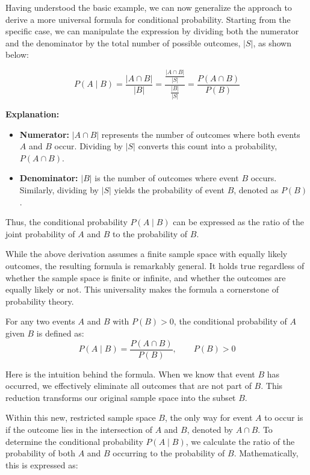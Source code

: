 Having understood the basic example, we can now generalize the approach to derive a more universal formula for conditional probability. Starting from the specific case, we can manipulate the expression by dividing both the numerator and the denominator by the total number of possible outcomes, \( |S| \), as shown below:

\[
P(A \mid B) = \frac{|A \cap B|}{|B|} = \frac{\frac{|A \cap B|}{|S|}}{\frac{|B|}{|S|}} = \frac{P(A \cap B)}{P(B)}
\]

\textbf{Explanation:}

\begin{itemize}
    \item \textbf{Numerator:} \( |A \cap B| \) represents the number of outcomes where both events \( A \) and \( B \) occur. Dividing by \( |S| \) converts this count into a probability, \( P(A \cap B) \).
    \item \textbf{Denominator:} \( |B| \) is the number of outcomes where event \( B \) occurs. Similarly, dividing by \( |S| \) yields the probability of event \( B \), denoted as \( P(B) \).
\end{itemize}

Thus, the conditional probability \( P(A \mid B) \) can be expressed as the ratio of the joint probability of \( A \) and \( B \) to the probability of \( B \).

While the above derivation assumes a finite sample space with equally likely outcomes, the resulting formula is remarkably general. It holds true regardless of whether the sample space is finite or infinite, and whether the outcomes are equally likely or not. This universality makes the formula a cornerstone of probability theory.

\begin{definition}
For any two events \( A \) and \( B \) with \( P(B) > 0 \), the conditional probability of \( A \) given \( B \) is defined as:
\[
P(A \mid B) = \frac{P(A \cap B)}{P(B)}, \qquad P(B) > 0
\]
\end{definition}

Here is the intuition behind the formula. When we know that event \( B \) has occurred, we effectively eliminate all outcomes that are not part of \( B \). This reduction transforms our original sample space into the subset \( B \).

Within this new, restricted sample space \( B \), the only way for event \( A \) to occur is if the outcome lies in the intersection of \( A \) and \( B \), denoted by \( A \cap B \). To determine the conditional probability \( P(A \mid B) \), we calculate the ratio of the probability of both \( A \) and \( B \) occurring to the probability of \( B \). Mathematically, this is expressed as:

